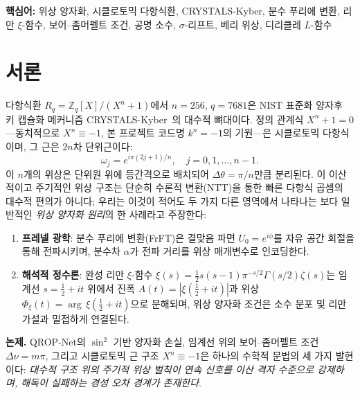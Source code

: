 \documentclass[11pt, a4paper]{article}
\theoremstyle{definition}
\theoremstyle{plain}
\newcommand{\Rq}{\mathbb{Z}_q[X]/(X^n+1)}
\newcommand{\xif}{\xi}
\newcommand{\Phiz}{\Phi_\xi}
\newcommand{\Ampl}{A}
\begin{document}
\vspace{0.5em}
\noindent\textbf{핵심어:} 위상 양자화, 시클로토믹 다항식환, CRYSTALS-Kyber,
분수 푸리에 변환, 리만 $\xif$-함수, 보어--좀머펠트 조건, 공명 소수,
$\sigma$-리프트, 베리 위상, 디리클레 $L$-함수

\tableofcontents
\newpage


\section{서론}
\label{sec:intro}

다항식환 $R_q = \Rq$에서 $n = 256$, $q = 7681$은 NIST 표준화 양자후 키 캡슐화 메커니즘 CRYSTALS-Kyber~\cite{kyber2021}의 대수적 뼈대이다. 정의 관계식 $X^n + 1 = 0$---동치적으로 $X^n \equiv -1$, 본 프로젝트 코드명 $k^n = -1$의 기원---은 시클로토믹 다항식이며, 그 근은 $2n$차 단위근이다:
\begin{equation}
  \omega_j = e^{i\pi(2j+1)/n}, \quad j = 0, 1, \ldots, n-1.
  \label{eq:cyclo_roots}
\end{equation}
이 $n$개의 위상은 단위원 위에 등간격으로 배치되어 $\Delta\theta = \pi/n$만큼 분리된다. 이 이산적이고 주기적인 위상 구조는 단순히 수론적 변환(NTT)을 통한 빠른 다항식 곱셈의 대수적 편의가 아니다; 우리는 이것이 적어도 두 가지 다른 영역에서 나타나는 보다 일반적인 \textit{위상 양자화 원리}의 한 사례라고 주장한다:

\begin{enumerate}
  \item \textbf{프레넬 광학}: 분수 푸리에 변환(FrFT)은 결맞음 파면 $U_0 = e^{i\phi}$를 자유 공간 회절을 통해 전파시키며, 분수차 $\alpha$가 전파 거리를 위상 매개변수로 인코딩한다.
  \item \textbf{해석적 정수론}: 완성 리만 $\xif$-함수 $\xif(s) = \tfrac{1}{2}s(s-1)\pi^{-s/2}\Gamma(s/2)\zeta(s)$는 임계선 $s = \tfrac{1}{2} + it$ 위에서 진폭 $\Ampl(t) = |\xif(\tfrac{1}{2}+it)|$과 위상 $\Phiz(t) = \arg\,\xif(\tfrac{1}{2}+it)$으로 분해되며, 위상 양자화 조건은 소수 분포 및 리만 가설과 밀접하게 연결된다.
\end{enumerate}

\textbf{논제.} QROP-Net의 $\sin^2$ 기반 양자화 손실, 임계선 위의 보어--좀머펠트 조건 $\Delta\nu = m\pi$, 그리고 시클로토믹 근 구조 $X^n \equiv -1$은 하나의 수학적 문법의 세 가지 발현이다: \textit{대수적 구조 위의 주기적 위상 벌칙이 연속 신호를 이산 격자 수준으로 강제하며, 해독이 실패하는 경성 오차 경계가 존재한다}.
\end{document}
